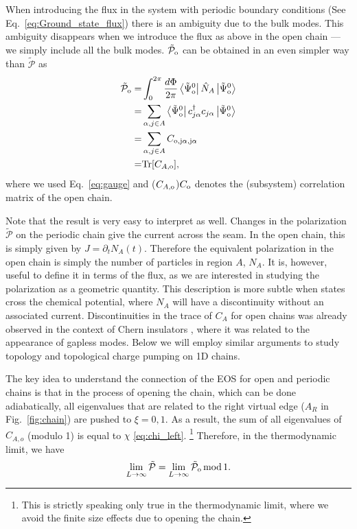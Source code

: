 \documentclass[twocolumn,amsmath,longbibliography,amssymb,superscriptaddress]{revtex4-1}
\newcommand{\tpo}{\tilde{\mathcal{P}}_{\rm o}}
\newcommand{\brapsio}[1]{\bra{\tilde{\Psi}_{{\rm o}}^#1}}
\newcommand{\ketpsio}[1]{\ket{\tilde{\Psi}_{{\rm o}}^#1}}
\begin{document}
When introducing the flux in the system with periodic boundary conditions (See Eq.~\eqref{eq:Ground_state_flux}) there is an ambiguity due to the bulk modes. 
This ambiguity disappears when we introduce the flux as above in the open chain --- we simply include all the bulk modes. 
$\tpo$ can be obtained in an even simpler way than $\tilde{\mathcal{P}}$ as 
\begin{align}\label{eq:phi_independence}
\tpo =&  \int_0^{2\pi}\frac{d\Phi}{2\pi} \brapsio{0} \hat{N}_A \ketpsio{0} \nonumber \\
=&\sum_{\alpha,j\in A}\brapsio{0} c_{j\alpha}^\dagger c_{j\alpha} \ketpsio{0} \nonumber\\
=&\sum_{\alpha,j\in A} C_{\rm o,j\alpha,j\alpha}\nonumber \\
=& {\rm Tr}[C_{A,\rm o}],
\end{align}
where we used Eq.~\eqref{eq:gauge} and ($C_{A,\rm o}$)$C_{\rm o}$ denotes the (subsystem) correlation matrix of the open chain.  

Note that the result is very easy to interpret as well. Changes in the polarization $\tilde{\mathcal{P}}$ on the periodic chain give the current across the seam. In the open chain, this is simply given by $J = \partial_t N_A(t)$. Therefore the equivalent polarization in the open chain is simply the number of particles in region $A$, $N_A$. It is, however, useful to define it in terms of the flux, as we are interested in studying the polarization as a geometric quantity. This description is more subtle when states cross the chemical potential, where $N_A$ will have a discontinuity without an associated current. Discontinuities in the trace of $C_A$ for open chains was already observed in the context of Chern insulators \cite{Alexandrinata2011}, where it was related to the appearance of gapless modes. Below we will employ similar arguments to study topology and topological charge pumping on 1D chains.

The key idea to understand the connection of the EOS for open and periodic chains is that in the process of opening the chain, which can be done adiabatically, all eigenvalues that are related to the right virtual edge ($A_R$ in Fig.~\ref{fig:chain}) are pushed to $\xi=0,1$. 
As a result, the sum of all eigenvalues of $C_{A,o}$ (modulo 1) is equal to $\chi$ \eqref{eq:chi_left}. \footnote{ This is strictly speaking only true in the thermodynamic limit, where we avoid the finite size effects due to opening the chain.} Therefore, in the thermodynamic limit, we have
\begin{equation}
\lim_{L \rightarrow \infty }\tilde{\mathcal{P}} = \lim_{L \rightarrow \infty } \tpo \, {\rm mod} \, 1.
\end{equation}
\end{document}
